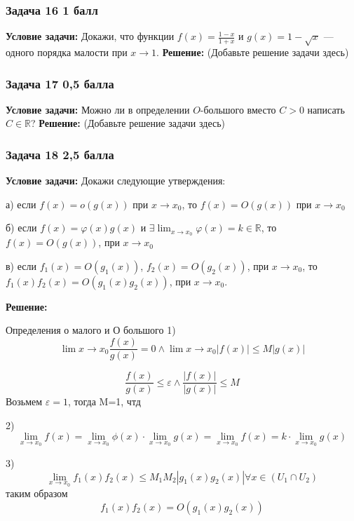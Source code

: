 \documentclass[a4paper,12pt]{article}
\begin{document}
\subsubsection{Задача 16 \hfill 1 балл}
\textbf{Условие задачи:} Докажи, что функции \( f(x) = \frac{1 - x}{1 + x} \) и \( g(x) = 1 - \sqrt{x} \) — одного порядка малости при \( x \to 1 \).
\textbf{Решение: } (Добавьте решение задачи здесь)

\vspace{1cm}

\subsubsection{Задача 17 \hfill 0,5 балла}
\textbf{Условие задачи:} Можно ли в определении \( O \)-большого вместо \( C > 0 \) написать \( C \in \mathbb{R} \)?
\textbf{Решение: } (Добавьте решение задачи здесь)

\vspace{1cm}

\subsubsection{Задача 18 \hfill 2,5 балла}
\textbf{Условие задачи:} Докажи следующие утверждения:

а) если \( f(x) = o(g(x)) \) при \( x \to x_0 \), то \( f(x) = O(g(x)) \) при \( x \to x_0 \)

б) если \( f(x) = \varphi(x)g(x) \) и \( \exists \lim_{x \to x_0} \varphi(x) = k \in \mathbb{R} \), то \( f(x) = O(g(x)) \), при \( x \to x_0 \)

в) если \( f_1(x) = O(g_1(x)) \), \( f_2(x) = O(g_2(x)) \), при \( x \to x_0 \), то \( f_1(x)f_2(x) = O(g_1(x)g_2(x)) \), при \( x \to x_0 \).

\textbf{Решение: } 

Определения о малого и О большого
1)
\[
\lim{x \to x_0} \frac{f(x)}{g(x)} = 0 \land \lim{x \to x_0} |f(x)| \le M|g(x)|
\]

\[
\frac{f(x)}{g(x)} \le \varepsilon \land \frac{|f(x)|}{|g(x)|} \le M
\]
Возьмем $\varepsilon = 1$, тогда M=1, чтд

2)
\[
\lim_{x \to x_0} f(x) = \lim_{x \to x_0}\phi(x) \cdot \lim_{x \to x_0} g(x) = \lim_{x \to x_0} f(x) = k \cdot \lim_{x \to x_0} g(x)
\]

3)
\[
\lim_{x \to x_0} f_1(x)f_2(x) \le M_1 M_2 |g_1(x)g_2(x)|  \forall x \in (U_1 \cap U_2)
\]
таким образом
\[
f_1(x)f_2(x) = O(g_1(x)g_2(x))
\]
\end{document}
